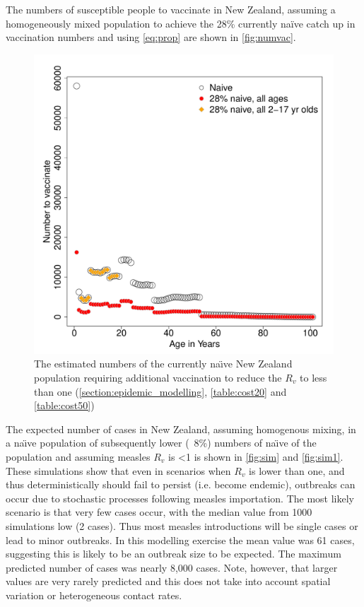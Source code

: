 \documentclass{article}
\begin{document}
The numbers of susceptible people to vaccinate in New Zealand, assuming a homogeneously mixed population to achieve the 28\% currently na\"{i}ve catch up in vaccination numbers and using \autoref{eq:prop} are shown in \autoref{fig:numvac}.


\begin{figure}[width=1\textwidth]
     \centering
\includegraphics{draftfinalreport_v2-071}
     \caption{The estimated numbers of the currently na\"{\i}ve New Zealand population requiring additional vaccination to reduce the $R_v$ to less than one (\autoref{section:epidemic_modelling}, \autoref{table:cost20} and \autoref{table:cost50})}
     \label{fig:numvac}
\end{figure}

The expected number of cases in New Zealand, assuming homogenous mixing, in a na\"{\i}ve population of subsequently lower (~8\%) numbers of na\"{\i}ve of the population and assuming measles $R_v$ is <1 is shown in \autoref{fig:sim} and \autoref{fig:sim1}. These simulations show that even in scenarios when $R_v$ is lower than one, and thus deterministically should fail to persist (i.e. become endemic), outbreaks can occur due to stochastic processes following measles importation. The most likely scenario is that very few cases occur, with the median value from 1000 simulations low (2 cases). Thus most measles introductions will be single cases or lead to minor outbreaks. In this modelling exercise the mean value was 61 cases, suggesting this is likely to be an outbreak size to be expected. The maximum predicted number of cases was nearly 8,000 cases. Note, however, that larger values are very rarely predicted and this does not take into account spatial variation or heterogeneous contact rates.
\end{document}
